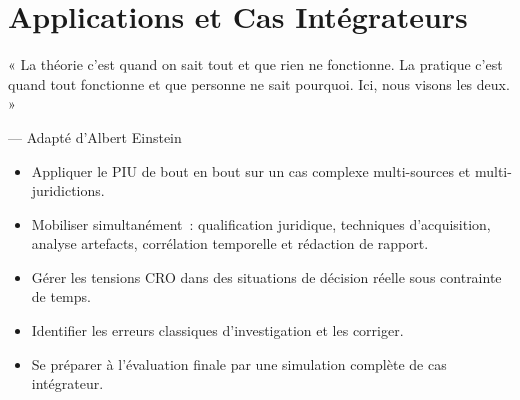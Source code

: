 
\chapter{Applications et Cas Intégrateurs}
\label{chap:cas-int}

\epigraph{%
    « La théorie c'est quand on sait tout et que rien ne fonctionne.
    La pratique c'est quand tout fonctionne et que personne ne sait
    pourquoi. Ici, nous visons les deux. »%
}{--- Adapté d'Albert Einstein}


\begin{boxobjectifs}
\begin{itemize}
    \item Appliquer le PIU de bout en bout sur un cas complexe
          multi-sources et multi-juridictions.
    \item Mobiliser simultanément~: qualification juridique,
          techniques d'acquisition, analyse artefacts, corrélation
          temporelle et rédaction de rapport.
    \item Gérer les tensions CRO dans des situations de décision
          réelle sous contrainte de temps.
    \item Identifier les erreurs classiques d'investigation et
          les corriger.
    \item Se préparer à l'évaluation finale par une simulation
          complète de cas intégrateur.
\end{itemize}
\end{boxobjectifs}


